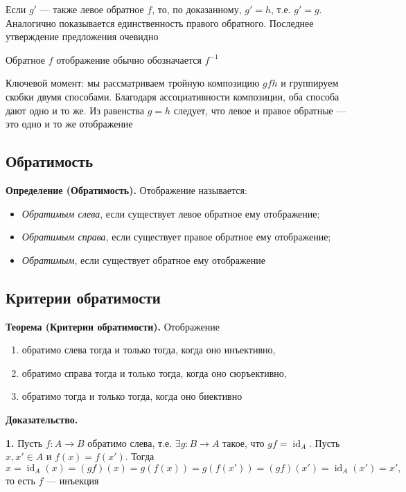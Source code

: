 \documentclass[a4paper,12pt]{article}
\theoremstyle{definition}
\theoremstyle{plain}
\theoremstyle{remark}
\begin{document}
	Если $g'$ — также левое обратное $f$, то, по доказанному, $g' = h$, т.е. $g' = g$. Аналогично показывается единственность правого обратного. Последнее утверждение предложения очевидно
	
	\medskip
	Обратное $f$ отображение обычно обозначается $f^{-1}$
	
	\begin{tcolorbox}[colback=green!5, colframe=green!50!black, title=Пояснение к доказательству]
		Ключевой момент: мы рассматриваем тройную композицию $gfh$ и группируем скобки двумя способами. Благодаря ассоциативности композиции, оба способа дают одно и то же. Из равенства $g = h$ следует, что левое и правое обратные — это одно и то же отображение
	\end{tcolorbox}
	
	\subsection{Обратимость}
	
	\noindent \textbf{Определение (Обратимость).}
	Отображение называется:
	\begin{itemize}
		\item \textit{Обратимым слева}, если существует левое обратное ему отображение;
		\item \textit{Обратимым справа}, если существует правое обратное ему отображение;
		\item \textit{Обратимым}, если существует обратное ему отображение
	\end{itemize}
	
	\subsection{Критерии обратимости}
	
	\noindent \textbf{Теорема (Критерии обратимости).}
	Отображение
	\begin{enumerate}
		\item обратимо слева тогда и только тогда, когда оно инъективно,
		\item обратимо справа тогда и только тогда, когда оно сюръективно,
		\item обратимо тогда и только тогда, когда оно биективно
	\end{enumerate}
	
	\medskip
	\noindent \textbf{Доказательство.}
	
	\textbf{1.} Пусть $f \colon A \to B$ обратимо слева, т.е. $\exists g \colon B \to A$ такое, что $gf = \operatorname{id}_A$. Пусть $x, x' \in A$ и $f(x) = f(x')$. Тогда
	\[
	x = \operatorname{id}_A(x) = (gf)(x) = g(f(x)) = g(f(x')) = (gf)(x') = \operatorname{id}_A(x') = x',
	\]
	то есть $f$ — инъекция
	
\end{document}
